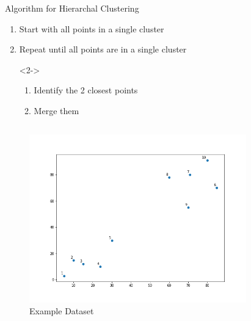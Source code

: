 \documentclass{beamer}
\begin{document}
\begin{frame}{Algorithm for Hierarchal Clustering}
\vspace{0.5cm}
\begin{enumerate}
\item<1-> Start with all points in a single cluster
\item<4-> Repeat until all points are in a single cluster
\item[]<2-> \begin{enumerate}
\item<2-> Identify the 2 closest points 
\item<3-> Merge them
\end{enumerate}
\end{enumerate}
\vspace{-0.8cm}
\begin{columns}[T]
  \begin{column}{0.5\textwidth}
    \begin{figure}
      \includegraphics[width=1.1\textwidth]{unsupervised/h_e_1.png}
      \vspace*{-0.6cm}
      \caption{Example Dataset}
    \end{figure}
  \end{column}
  \begin{column}{0.5\textwidth}
    \begin{figure}
    \begin{overprint}

\end{overprint}
\end{figure}
\end{column}
\end{columns}
\end{frame}
\end{document}

